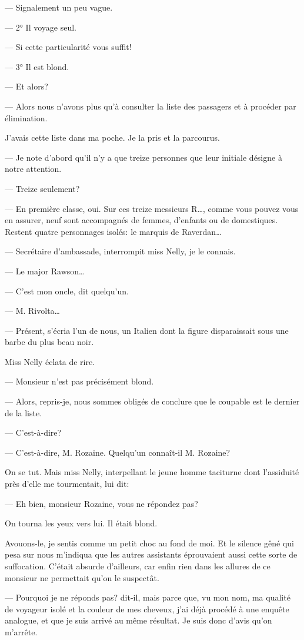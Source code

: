 \documentclass[12pt,a4paper]{article}
\begin{document}
— Signalement un peu vague.

— 2° Il voyage seul.

— Si cette particularité vous suffit!

— 3° Il est blond.

— Et alors?

— Alors nous n’avons plus qu’à consulter la liste des passagers et à procéder par élimination.

J’avais cette liste dans ma poche. Je la pris et la parcourus. 

— Je note d’abord qu’il n’y a que treize personnes que leur initiale désigne à notre attention.

— Treize seulement?

— En première classe, oui. Sur ces treize messieurs R…, comme vous pouvez vous en assurer, neuf sont accompagnés de femmes, d’enfants ou de domestiques. Restent quatre personnages isolés: le marquis de Raverdan…

— Secrétaire d’ambassade, interrompit miss Nelly, je le connais.

— Le major Rawson…

— C’est mon oncle, dit quelqu’un.

— M. Rivolta…

— Présent, s’écria l’un de nous, un Italien dont la figure disparaissait sous une barbe du plus beau noir.

Miss Nelly éclata de rire.

— Monsieur n’est pas précisément blond.

— Alors, repris-je, nous sommes obligés de conclure que le coupable est le dernier de la liste.

— C’est-à-dire?

— C’est-à-dire, M. Rozaine. Quelqu’un connaît-il M. Rozaine?

On se tut. Mais miss Nelly, interpellant le jeune homme taciturne dont l’assiduité près d’elle me tourmentait, lui dit:

— Eh bien, monsieur Rozaine, vous ne répondez pas? 

On tourna les yeux vers lui. Il était blond.

Avouons-le, je sentis comme un petit choc au fond de moi. Et le silence gêné qui pesa sur nous m’indiqua que les autres assistants éprouvaient aussi cette sorte de suffocation. C’était absurde d’ailleurs, car enfin rien dans les allures de ce monsieur ne permettait qu’on le suspectât.

— Pourquoi je ne réponds pas? dit-il, mais parce que, vu mon nom, ma qualité de voyageur isolé et la couleur de mes cheveux, j’ai déjà procédé à une enquête analogue, et que je suis arrivé au même résultat. Je suis donc d’avis qu’on m’arrête.
\end{document}
